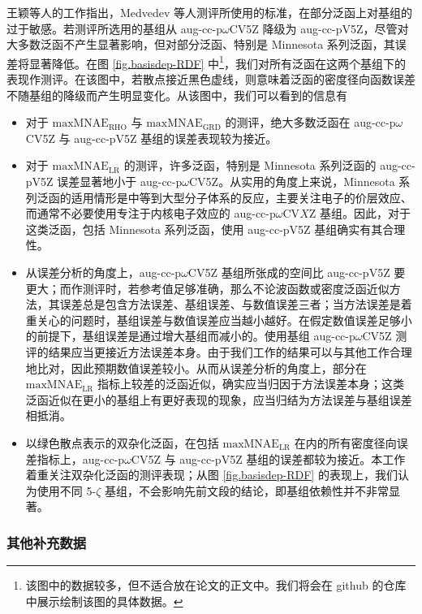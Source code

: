 王颖等人\cite{Wang-He.JCTC.2017}的工作指出，Medvedev 等人\cite{Medvedev-Lyssenko.S.2017}测评所使用的标准，在部分泛函上对基组的过于敏感。若测评所选用的基组从 aug-cc-p$\omega$CV5Z 降级为 aug-cc-pV5Z，尽管对大多数泛函不产生显著影响，但对部分泛函、特别是 Minnesota 系列泛函，其误差将显著降低。在图 \ref{fig.basisdep-RDF} 中\footnote{该图中的数据较多，但不适合放在论文的正文中。\alert{我们将会在 github 的仓库中展示绘制该图的具体数据。}}，我们对所有泛函在这两个基组下的表现作测评。在该图中，若散点接近黑色虚线，则意味着泛函的密度径向函数误差不随基组的降级而产生明显变化。从该图中，我们可以看到的信息有
\begin{itemize}[nosep]
    \item 对于 $\text{maxMNAE}_\text{RHO}$ 与 $\text{maxMNAE}_\text{GRD}$ 的测评，绝大多数泛函在 aug-cc-p$\omega$CV5Z 与 aug-cc-pV5Z 基组的误差表现较为接近。
    \item 对于 $\text{maxMNAE}_\text{LR}$ 的测评，许多泛函，特别是 Minnesota 系列泛函的 aug-cc-pV5Z 误差显著地小于 aug-cc-p$\omega$CV5Z。从实用的角度上来说，Minnesota 系列泛函的适用情形是中等到大型分子体系的反应，主要关注电子的价层效应、而通常不必要使用专注于内核电子效应的 aug-cc-p$\omega$CV$X$Z 基组。因此，对于这类泛函，包括 Minnesota 系列泛函，使用 aug-cc-pV5Z 基组确实有其合理性。
    \item 从误差分析的角度上，aug-cc-p$\omega$CV5Z 基组所张成的空间比 aug-cc-pV5Z 要更大；而作测评时，若参考值足够准确，那么不论波函数或密度泛函近似方法，其误差总是包含方法误差、基组误差、与数值误差三者；当方法误差是着重关心的问题时，基组误差与数值误差应当越小越好。在假定数值误差足够小的前提下，基组误差是通过增大基组而减小的。使用基组 aug-cc-p$\omega$CV5Z 测评的结果应当更接近方法误差本身。由于我们工作的结果可以与其他工作合理地比对\cite{Medvedev-Lyssenko.S.2017, Kepp-Kepp.S.2017, Wang-He.JCTC.2017}，因此预期数值误差较小。从而从误差分析的角度上，部分在 $\text{maxMNAE}_\text{LR}$ 指标上较差的泛函近似，确实应当归因于方法误差本身；这类泛函近似在更小的基组上有更好表现的现象，应当归结为方法误差与基组误差相抵消。
    \item 以绿色散点表示的双杂化泛函，在包括 $\text{maxMNAE}_\text{LR}$ 在内的所有密度径向误差指标上，aug-cc-p$\omega$CV5Z 与 aug-cc-pV5Z 基组的误差都较为接近。本工作着重关注双杂化泛函的测评表现；从图 \ref{fig.basisdep-RDF} 的表现上，我们认为使用不同 5-$\zeta$ 基组，不会影响先前文段的结论，即基组依赖性并不非常显著。
\end{itemize}

\subsubsection{其他补充数据}

